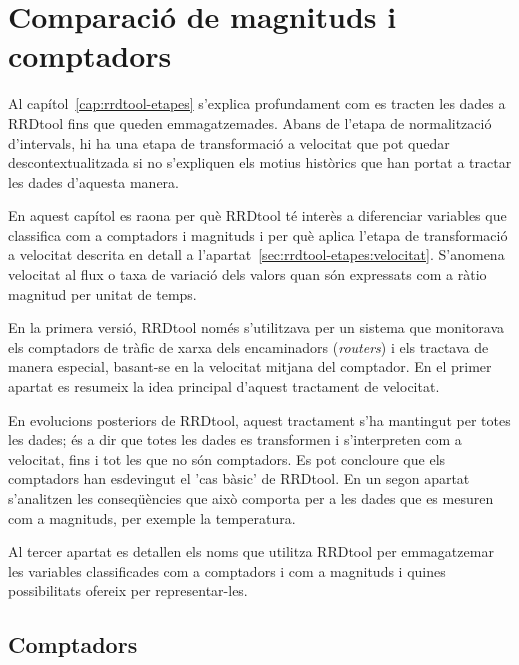 \chapter[Magnituds i comptadors]{Comparació de magnituds i comptadors}
\label{cap:velocitats}


Al capítol~\ref{cap:rrdtool-etapes} s'explica profundament com es tracten les dades a RRDtool fins que queden emmagatzemades. Abans de l'etapa de normalització d'intervals, hi ha una etapa de transformació a velocitat que pot quedar descontextualitzada si no s'expliquen els motius històrics que han portat a tractar les dades d'aquesta manera. 

En aquest capítol es raona per què RRDtool té interès a diferenciar variables que classifica com a comptadors i magnituds i per què aplica l'etapa de transformació a velocitat descrita en detall a l'apartat~\ref{sec:rrdtool-etapes:velocitat}. S'anomena velocitat al flux o taxa de variació dels valors quan són expressats com a ràtio magnitud per unitat de temps.


En la primera versió, RRDtool només s'utilitzava per un sistema que monitorava els comptadors de tràfic de xarxa dels encaminadors (\emph{routers}) i els tractava de manera especial, basant-se en la velocitat mitjana del comptador. 
En el primer apartat es resumeix la idea principal d'aquest tractament de velocitat. 

En evolucions posteriors de RRDtool, aquest tractament s'ha mantingut per totes les dades; és a dir que totes les dades es transformen i s'interpreten com a velocitat, fins i tot les que no són comptadors. Es pot concloure que els comptadors han esdevingut el 'cas bàsic' de RRDtool. En un segon apartat s'analitzen les conseqüències que això comporta per a les dades que es mesuren com a magnituds, per exemple la temperatura. 

Al tercer apartat es detallen els noms que utilitza RRDtool per emmagatzemar les variables classificades com a comptadors i com a magnituds i quines possibilitats ofereix per representar-les.

\section{Comptadors}

